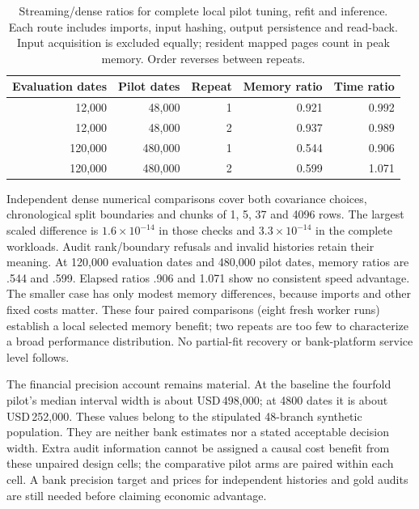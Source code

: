 \begin{table}[htbp]
\centering\small
\begin{tabular}{rrrrr}
\toprule
Evaluation dates & Pilot dates & Repeat & Memory ratio & Time ratio\\
\midrule
12,000 & 48,000 & 1 & 0.921 & 0.992\\
12,000 & 48,000 & 2 & 0.937 & 0.989\\
120,000 & 480,000 & 1 & 0.544 & 0.906\\
120,000 & 480,000 & 2 & 0.599 & 1.071\\
\bottomrule
\end{tabular}
\caption{Streaming/dense ratios for complete local pilot tuning, refit and inference. Each route includes imports, input hashing, output persistence and read-back. Input acquisition is excluded equally; resident mapped pages count in peak memory. Order reverses between repeats.}
\label{tab:v10:workload}
\end{table}
Independent dense numerical comparisons cover both covariance choices,
chronological split boundaries and chunks of 1, 5, 37 and 4096 rows. The
largest scaled difference is $1.6\times10^{-14}$ in those checks and
$3.3\times10^{-14}$ in the complete workloads. Audit rank/boundary refusals
and invalid histories retain their meaning. At 120,000 evaluation dates and
480,000 pilot dates, memory ratios are .544 and .599. Elapsed ratios .906 and
1.071 show no consistent speed advantage. The smaller case has only modest
memory differences, because imports and other fixed costs matter. These
four paired comparisons (eight fresh worker runs) establish a local selected memory benefit;
two repeats are too few to characterize a broad performance distribution.
No partial-fit recovery or bank-platform service level follows.

The financial precision account remains material. At the baseline the
fourfold pilot's median interval width is about USD\,498,000; at 4800 dates
it is about USD\,252,000. These values belong to the stipulated 48-branch
synthetic population. They are neither bank estimates nor a stated acceptable
decision width. Extra audit information cannot be assigned a causal cost benefit
from these unpaired design cells; the comparative pilot arms are paired within
each cell. A bank precision target and prices for independent histories and
gold audits are still needed before claiming economic advantage.





